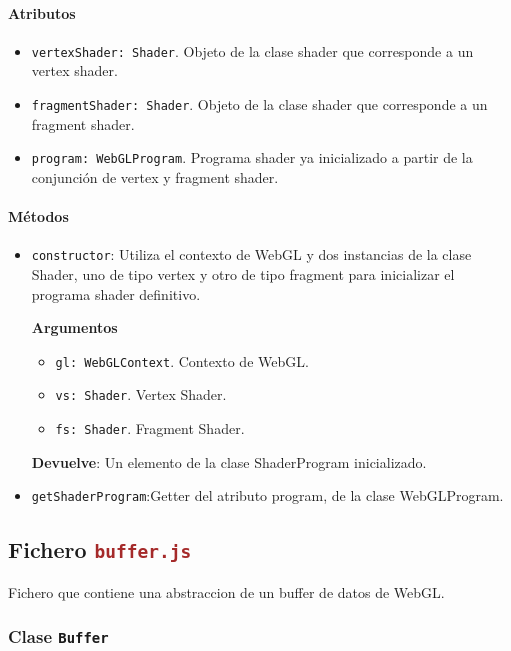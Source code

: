 \paragraph*{Atributos}
\begin{itemize}
    \item \verb|vertexShader: Shader|. Objeto de la clase shader que corresponde a un vertex shader.
    \item \verb|fragmentShader: Shader|. Objeto de la clase shader que corresponde a un fragment shader.
    \item \verb|program: WebGLProgram|. Programa shader ya inicializado a partir de la conjunción de vertex y fragment shader.
\end{itemize}

\paragraph*{Métodos}
\begin{itemize}
    \item \verb|constructor|: Utiliza el contexto de WebGL y dos instancias de la clase Shader, uno de tipo vertex y otro de tipo fragment para inicializar el programa shader definitivo.
    
    \textbf{Argumentos}
    \begin{itemize}
        \item \verb|gl: WebGLContext|. Contexto de WebGL.
        \item \verb|vs: Shader|. Vertex Shader.
        \item \verb|fs: Shader|. Fragment Shader.
    \end{itemize}
    \textbf{Devuelve}: Un elemento de la clase ShaderProgram inicializado.
    \item \verb|getShaderProgram|:Getter del atributo program, de la clase WebGLProgram.
\end{itemize}

\subsection{Fichero \Large\texttt{\textcolor{brown}{buffer.js}}}

Fichero que contiene una abstraccion de un buffer de datos de WebGL.

\subsubsection{Clase \Large\texttt{\textcolor{Bittersweet}{Buffer}}}

